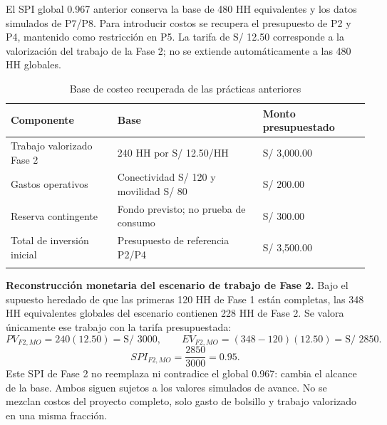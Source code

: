 El SPI global 0.967 anterior conserva la base de 480 HH equivalentes y los datos simulados de P7/P8. Para introducir costos se recupera el presupuesto de P2 y P4, mantenido como restricción en P5. La tarifa de S/ 12.50 corresponde a la valorización del trabajo de la Fase 2; no se extiende automáticamente a las 480 HH globales.
\begin{table}[H]
\centering\small{}
\caption{Base de costeo recuperada de las prácticas anteriores}
\begin{tabularx}{\textwidth}{P{3cm}YY}
\toprule
\textbf{Componente} & \textbf{Base} & \textbf{Monto presupuestado} \\
\midrule
Trabajo valorizado Fase 2 & 240 HH por S/ 12.50/HH & S/ 3,000.00 \\
\addlinespace
Gastos operativos & Conectividad S/ 120 y movilidad S/ 80 & S/ 200.00 \\
\addlinespace
Reserva contingente & Fondo previsto; no prueba de consumo & S/ 300.00 \\
\addlinespace
Total de inversión inicial & Presupuesto de referencia P2/P4 & S/ 3,500.00 \\
\addlinespace
\bottomrule
\end{tabularx}
\end{table}
\textbf{Reconstrucción monetaria del escenario de trabajo de Fase 2.} Bajo el supuesto heredado de que las primeras 120 HH de Fase 1 están completas, las 348 HH equivalentes globales del escenario contienen 228 HH de Fase 2. Se valora únicamente ese trabajo con la tarifa presupuestada:
\[
PV_{F2,MO}=240(12.50)=\text{S/ }3000,\qquad
EV_{F2,MO}=(348-120)(12.50)=\text{S/ }2850.
\]
\[
SPI_{F2,MO}=\frac{2850}{3000}=0.95.
\]
Este SPI de Fase 2 no reemplaza ni contradice el global 0.967: cambia el alcance de la base. Ambos siguen sujetos a los valores simulados de avance. No se mezclan costos del proyecto completo, solo gasto de bolsillo y trabajo valorizado en una misma fracción.

